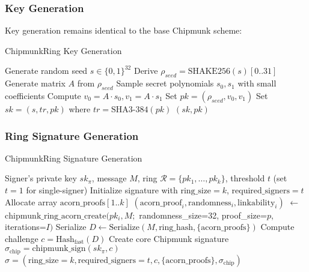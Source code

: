 \documentclass[11pt,a4paper]{article}
\begin{document}
\subsubsection{Key Generation}
Key generation remains identical to the base Chipmunk scheme:
\begin{algorithm}
\caption{ChipmunkRing Key Generation}
\begin{algorithmic}[1]
\STATE Generate random seed $s \in \{0,1\}^{32}$
\STATE Derive $\rho_{seed} = \text{SHAKE256}(s)[0..31]$
\STATE Generate matrix $A$ from $\rho_{seed}$
\STATE Sample secret polynomials $s_0, s_1$ with small coefficients
\STATE Compute $v_0 = A \cdot s_0, v_1 = A \cdot s_1$
\STATE Set $pk = (\rho_{seed}, v_0, v_1)$
\STATE Set $sk = (s, tr, pk)$ where $tr = \text{SHA3-384}(pk)$
\RETURN $(sk, pk)$
\end{algorithmic}
\end{algorithm}

\subsubsection{Ring Signature Generation}
\begin{algorithm}
\caption{ChipmunkRing Signature Generation}
\begin{algorithmic}[1]
\REQUIRE Signer's private key $sk_\pi$, message $M$, ring $\mathcal{R} = \{pk_1, \ldots, pk_k\}$, threshold $t$ (set $t=1$ for single-signer)
\STATE Initialize signature with $\text{ring\_size}=k$, $\text{required\_signers}=t$
\STATE Allocate array $\text{acorn\_proofs}[1..k]$
    \STATE $(\text{acorn\_proof}_i, \text{randomness}_i, \text{linkability}_i)$ $\leftarrow$ $\text{chipmunk\_ring\_acorn\_create}(pk_i, M;$ randomness\_size=32, proof\_size=$p$, iterations=$I)$
\ENDFOR
\STATE Serialize $D \leftarrow \text{Serialize}(M, \text{ring\_hash}, \{\text{acorn\_proofs}\})$
\STATE Compute challenge $c = \text{Hash}_{\text{fast}}(D)$ 
\STATE Create core Chipmunk signature $\sigma_{\text{chip}} = \text{chipmunk\_sign}(sk_\pi, c)$
\RETURN $\sigma = (\text{ring\_size}=k, \text{required\_signers}=t, c, \{\text{acorn\_proofs}\}, \sigma_{\text{chip}})$
\end{algorithmic}
\end{algorithm}
\end{document}

